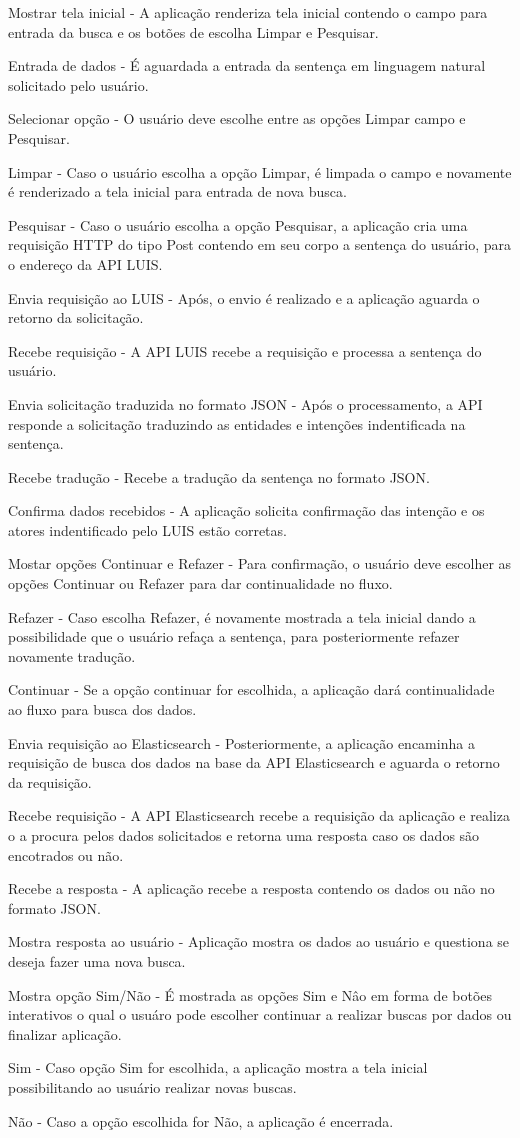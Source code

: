 	Mostrar tela inicial - A aplicação renderiza tela inicial contendo o campo para entrada da busca e os botões de escolha Limpar e Pesquisar.

	Entrada de dados - É aguardada a entrada da sentença em linguagem natural solicitado pelo usuário.

	Selecionar opção - O usuário deve escolhe entre as opções Limpar campo e Pesquisar.

	Limpar - Caso o usuário escolha a opção Limpar, é limpada o campo e novamente é renderizado a tela inicial para entrada de nova busca.

	Pesquisar - Caso o usuário escolha a opção Pesquisar, a aplicação cria uma requisição HTTP do tipo Post contendo em seu corpo a sentença do usuário, para o endereço da API LUIS.

	Envia requisição ao LUIS - Após, o envio é realizado e a aplicação aguarda o retorno da solicitação.

	Recebe requisição - A API LUIS recebe a requisição e processa a sentença do usuário.

	Envia solicitação traduzida no formato JSON - Após o processamento, a API responde a solicitação traduzindo as entidades e intenções indentificada na sentença.

	Recebe tradução - Recebe a tradução da sentença no formato JSON.

	Confirma dados recebidos - A aplicação solicita confirmação das intenção e os atores indentificado pelo LUIS estão corretas.

	Mostar opções Continuar e Refazer - Para confirmação, o usuário deve escolher as opções Continuar ou Refazer para dar continualidade no fluxo.

	Refazer - Caso escolha Refazer, é novamente mostrada a tela inicial dando a possibilidade que o usuário refaça a sentença, para posteriormente refazer novamente tradução.

	Continuar - Se a opção continuar for escolhida, a aplicação dará continualidade ao fluxo para busca dos dados.

	Envia requisição ao Elasticsearch - Posteriormente, a aplicação encaminha a requisição  de busca dos dados na base da API Elasticsearch e aguarda o retorno da requisição.

	Recebe requisição - A API Elasticsearch recebe a requisição da aplicação e realiza o a procura pelos dados solicitados e retorna uma resposta caso os dados são encotrados ou não.

	Recebe a resposta - A aplicação recebe a resposta contendo os dados ou não no formato JSON.

	Mostra resposta ao usuário - Aplicação mostra os dados ao usuário e questiona se deseja fazer uma nova busca.

	Mostra opção Sim/Não - É mostrada as opções Sim e Nâo em forma de botões interativos o qual o usuáro pode escolher continuar a realizar buscas por dados ou finalizar aplicação.

	Sim - Caso opção Sim for escolhida, a aplicação mostra a tela inicial possibilitando ao usuário realizar novas buscas.

	Não - Caso a opção escolhida for Não, a aplicação é encerrada.
